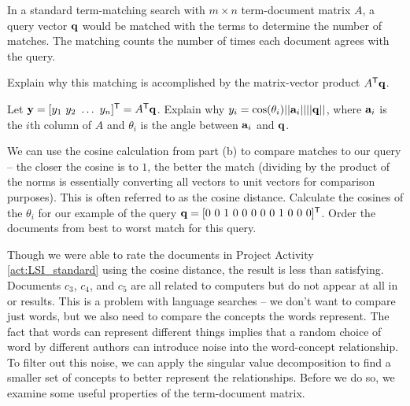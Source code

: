 \begin{pactivity} \label{act:LSI_standard} In a standard term-matching search with $m \times n$ term-document matrix $A$, a query vector  $\mathbf{q}$ would be matched with the terms to determine the number of matches. The matching counts the number of times each document agrees with the query.
\ba
\item Explain why this matching is accomplished by the matrix-vector product $A^{\mathsf{T}} \mathbf{q}$. 


\item Let $\mathbf{y} = [y_1 \ y_2 \ \ldots \ y_n]^{\mathsf{T}} = A^{\mathsf{T}} \mathbf{q}$. Explain why $y_i = \cos(\theta_i) ||\mathbf{a}_i|| ||\mathbf{q}||$, where $\mathbf{a}_i$ is the $i$th column of $A$ and  $\theta_i$ is the angle between $\mathbf{a}_i$ and $\mathbf{q}$. 


\item  We can use the cosine calculation from part (b) to compare matches to our query -- the closer the cosine is to $1$, the better the match (dividing by the product of the norms is essentially converting all vectors to unit vectors for comparison purposes). This is often referred to as the cosine distance. Calculate the cosines of the $\theta_i$ for our example of the query $\mathbf{q}= [0 \ 0 \ 1 \ 0  \ 0 \ 0 \ 0 \ 0 \ 1 \ 0 \ 0 \ 0 ]^{\mathsf{T}}$. Order the documents from best to worst match for this query. 

\ea

\end{pactivity}

Though we were able to rate the documents in Project Activity \ref{act:LSI_standard} using the cosine distance, the result is less than satisfying.  Documents $c_3$, $c_4$, and $c_5$ are all related to computers but do not appear at all in or results. This is a problem with language searches -- we don't want to compare just words, but we also need to compare the concepts the words represent. The fact that words can represent different things implies that a random choice of word by different authors can introduce noise into the word-concept relationship. To filter out this noise, we can apply the singular value decomposition to find a smaller set of concepts to better represent the relationships. Before we do so, we examine some useful properties of the term-document matrix.
 
